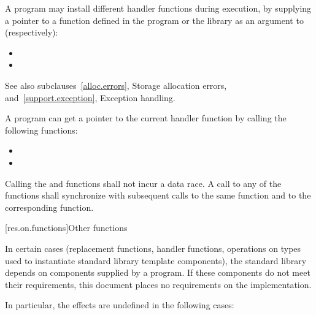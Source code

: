 \pnum
A \Cpp{} program may install different handler functions during execution, by
supplying a pointer to a function defined in the program or the library
as an argument to (respectively):
\begin{itemize}
\item {}
\item {}
\end{itemize}
See also subclauses~\ref{alloc.errors}, Storage allocation errors, and~\ref{support.exception},
Exception handling.

\pnum
A \Cpp{} program can get a pointer to the current handler function by calling the following
functions:

\begin{itemize}
\item
{}%
\item
{}
\end{itemize}

\pnum
Calling the  and  functions shall not incur a data race. A call to
any of the  functions shall synchronize with subsequent calls to the same
 function and to the corresponding  function.

[res.on.functions]{Other functions}

\pnum
In certain cases (replacement functions, handler functions, operations on types used to
instantiate standard library template components), the \Cpp{} standard library depends on
components supplied by a \Cpp{} program.
If these components do not meet their requirements, this document places no requirements
on the implementation.

\pnum
In particular, the effects are undefined in the following cases:

